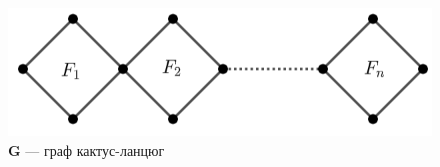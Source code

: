 \begin{figure}[H]
    \centering
    \includegraphics[width=0.6\linewidth]{pictures/Ch1.png}
    \caption{\textbf{G} --- граф кактус-ланцюг}
    \label{Ch1:image}
\end{figure}